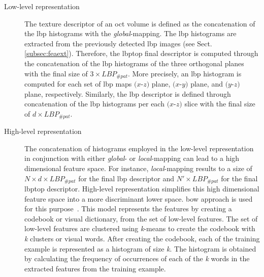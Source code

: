 \begin{description}

\item[Low-level representation] The texture descriptor of an \ac{oct} volume is defined as the concatenation of the \ac{lbp} histograms with the \emph{global}-mapping.
The \ac{lbp} histograms are extracted from the previously detected \ac{lbp} images (see Sect.\,\ref{subsec:feaext}).
Therefore, the \ac{lbptop} final descriptor is computed through the concatenation of the \ac{lbp} histograms of the three orthogonal planes with the final size of $3 \times LBP_{\#pat}$.
More precisely, an \ac{lbp} histogram is computed for each set of \ac{lbp} maps $(x$-$z)$ plane, $(x$-$y)$ plane, and $(y$-$z)$ plane, respectively.
Similarly, the \ac{lbp} descriptor is defined through concatenation of the \ac{lbp} histograms per each $(x$-$z)$ slice with the final size of $d \times LBP_{\#pat}$.

\item[High-level representation] The concatenation of histograms employed in the low-level representation in conjunction with either \emph{global}- or \emph{local}-mapping can lead to a high dimensional feature space.
For instance, \emph{local}-mapping results to a size of $N \times d \times LBP_{\#pat}$ for the final \ac{lbp} descriptor and $N' \times LBP_{\#pat}$ for the final \ac{lbptop} descriptor.
High-level representation simplifies this high dimensional feature space into a more discriminant lower space.
\ac{bow} approach is used for this purpose~\cite{Sivic2003}.
This model represents the features by creating a codebook or visual dictionary, from the set of low-level features.
The set of low-level features are clustered using \textit{k}-means to create the codebook with \textit{k} clusters or visual words.
After creating the codebook, each of the training example is represented as a histogram of size \textit{k}.
The histogram is obtained by calculating the frequency of occurrences of each of the \textit{k} words in the extracted features from the training example.

\end{description}

